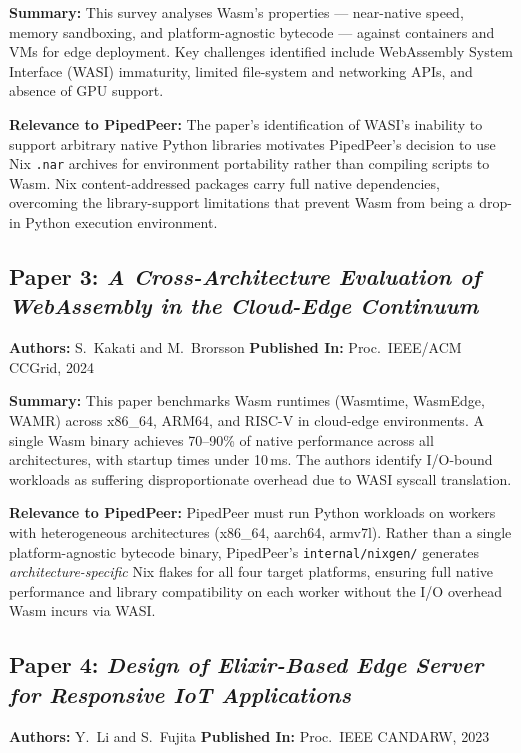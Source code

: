 \noindent\textbf{Summary:}
This survey analyses Wasm's properties — near-native speed, memory sandboxing,
and platform-agnostic bytecode — against containers and VMs for edge deployment.
Key challenges identified include WebAssembly System Interface (WASI) immaturity,
limited file-system and networking APIs, and absence of GPU support.

\noindent\textbf{Relevance to PipedPeer:}
The paper's identification of WASI's inability to support arbitrary native Python
libraries motivates PipedPeer's decision to use Nix \texttt{.nar} archives for
environment portability rather than compiling scripts to Wasm. Nix content-addressed
packages carry full native dependencies, overcoming the library-support limitations
that prevent Wasm from being a drop-in Python execution environment.

\subsection*{Paper 3: \textit{A Cross-Architecture Evaluation of WebAssembly in the
Cloud-Edge Continuum}}
\textbf{Authors:} S.~Kakati and M.~Brorsson \quad
\textbf{Published In:} Proc.\ IEEE/ACM CCGrid, 2024~\cite{kakati2024}

\noindent\textbf{Summary:}
This paper benchmarks Wasm runtimes (Wasmtime, WasmEdge, WAMR) across x86\_64,
ARM64, and RISC-V in cloud-edge environments. A single Wasm binary achieves
70--90\% of native performance across all architectures, with startup times under
10\,ms. The authors identify I/O-bound workloads as suffering disproportionate
overhead due to WASI syscall translation.

\noindent\textbf{Relevance to PipedPeer:}
PipedPeer must run Python workloads on workers with heterogeneous architectures
(x86\_64, aarch64, armv7l). Rather than a single platform-agnostic bytecode binary,
PipedPeer's \texttt{internal/nixgen/} generates \emph{architecture-specific} Nix
flakes for all four target platforms, ensuring full native performance and library
compatibility on each worker without the I/O overhead Wasm incurs via WASI.

\subsection*{Paper 4: \textit{Design of Elixir-Based Edge Server for Responsive IoT
Applications}}
\textbf{Authors:} Y.~Li and S.~Fujita \quad
\textbf{Published In:} Proc.\ IEEE CANDARW, 2023~\cite{li2023elixir}

